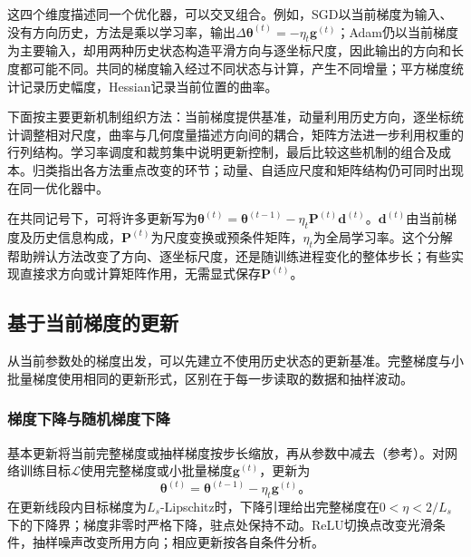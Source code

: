 这四个维度描述同一个优化器，可以交叉组合。例如，SGD以当前梯度为输入、没有方向历史，方法是乘以学习率，输出$\Delta\bm\theta^{(t)}=-\eta_t\bm g^{(t)}$；Adam仍以当前梯度为主要输入，却用两种历史状态构造平滑方向与逐坐标尺度，因此输出的方向和长度都可能不同。共同的梯度输入经过不同状态与计算，产生不同增量；平方梯度统计记录历史幅度，Hessian记录当前位置的曲率。

下面按主要更新机制组织方法：当前梯度提供基准，动量利用历史方向，逐坐标统计调整相对尺度，曲率与几何度量描述方向间的耦合，矩阵方法进一步利用权重的行列结构。学习率调度和裁剪集中说明更新控制，最后比较这些机制的组合及成本。归类指出各方法重点改变的环节；动量、自适应尺度和矩阵结构仍可同时出现在同一优化器中。

在共同记号下，可将许多更新写为$\bm\theta^{(t)}=\bm\theta^{(t-1)}-\eta_t\bm P^{(t)}\bm d^{(t)}$。$\bm d^{(t)}$由当前梯度及历史信息构成，$\bm P^{(t)}$为尺度变换或预条件矩阵，$\eta_t$为全局学习率。这个分解帮助辨认方法改变了方向、逐坐标尺度，还是随训练进程变化的整体步长；有些实现直接求方向或计算矩阵作用，无需显式保存$\bm P^{(t)}$。

\subsection{基于当前梯度的更新}
\label{sec:training-current-gradient}

从当前参数处的梯度出发，可以先建立不使用历史状态的更新基准。完整梯度与小批量梯度使用相同的更新形式，区别在于每一步读取的数据和抽样波动。

\subsubsection{梯度下降与随机梯度下降}
\label{sec:training-gradient-schedules}

基本更新将当前完整梯度或抽样梯度按步长缩放，再从参数中减去（参考）。对网络训练目标$\mathcal L$使用完整梯度或小批量梯度$\bm g^{(t)}$，更新为
\begin{equation}
  \bm\theta^{(t)}=\bm\theta^{(t-1)}-\eta_t\bm g^{(t)}\text{。}
  \label{eq:training-sgd}
\end{equation}
在更新线段内目标梯度为$L_s$-Lipschitz时，下降引理给出完整梯度在$0<\eta<2/L_s$下的下降界；梯度非零时严格下降，驻点处保持不动。ReLU切换点改变光滑条件，抽样噪声改变所用方向；相应更新按各自条件分析。

